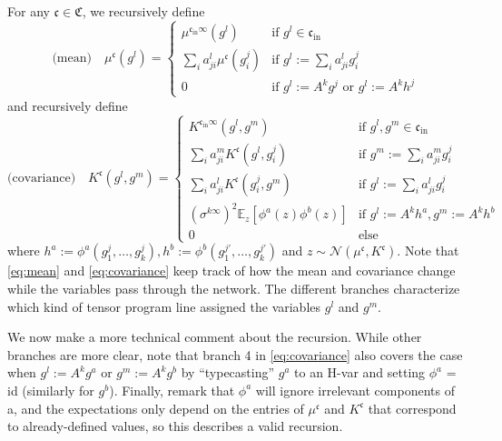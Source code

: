 \documentclass[11pt,notitlepage]{article}
\numberwithin{equation}{section}
\def\normdist{\mathcal{N}}
\theoremstyle{remark}
\theoremstyle{definition}
\begin{document}
	For any $\mathfrak{c} \in \mathfrak{C}$, we recursively define
	\begin{equation}\label{eq:mean}
	\text{(mean)} \quad \mu^{\mathfrak{c}}(g^l) =
	\begin{cases}
	\mu^{\mathfrak{c}_{\text{in}}\infty}(g^l) & \text{if } g^l \in \mathfrak{c}_{\text{in}}\\
	\sum_i a^l_{ji} \mu^{\mathfrak{c}}(g^j_i) & \text{if } g^l := \sum_i a^l_{ji} g^j_i \\
	0 & \text{if } g^l := A^k g^j \text{ or } g^l := A^k h^j
	\end{cases}
	\end{equation}
	and recursively define
	\begin{equation}\label{eq:covariance}
	\text{(covariance)} \quad K^{\mathfrak{c}}(g^l, g^m) =
	\begin{cases}
	K^{\mathfrak{c}_{\text{in}}\infty}(g^l, g^m) & \text{if } g^l, g^m \in \mathfrak{c}_{\text{in}}\\
	\sum_i a^m_{ji} K^{\mathfrak{c}}(g^l, g^j_i) & \text{if } g^m := \sum_i a^m_{ji} g^j_i \\
	\sum_i a^l_{ji} K^{\mathfrak{c}}(g^j_i, g^m) & \text{if } g^l := \sum_i a^l_{ji} g^j_i \\
	(\sigma^{k\infty})^2 \mathbb{E}_z[\phi^a(z)\phi^b(z)] & \text{if } g^l:= A^k h^a, g^m := A^k h^b \\
	0 & \text{else}
	\end{cases}
	\end{equation}
	where $h^a := \phi^a(g^j_1, \dots, g^j_k), h^b := \phi^b(g^{j'}_1, \dots, g^{j'}_k)$ and $z \sim \normdist(\mu^{\mathfrak{c}}, K^{\mathfrak{c}})$.
	Note that \eqref{eq:mean} and \eqref{eq:covariance} keep track of how the mean and covariance change while the variables pass through the network. The different branches characterize which kind of tensor program line assigned the variables $g^l$ and $g^m$.
	
	We now make a more technical comment about the recursion.
	While other branches are more clear, note that branch 4 in \eqref{eq:covariance} also covers the case when $g^l := A^k g^a$ or $g^m := A^k g^b$ by ``typecasting'' $g^a$ to an H-var and setting $\phi^a$ = id (similarly for $g^b$).
	Finally, remark that $\phi^a$ will ignore irrelevant components of a, and the expectations only depend on the entries of $\mu^{\mathfrak{c}}$ and $K^{\mathfrak{c}}$ that correspond to already-defined values, so this describes a valid recursion.
	
\end{document}
